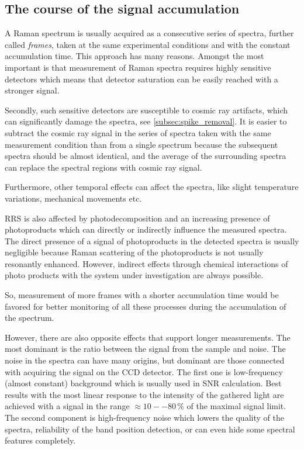\subsection{The course of the signal accumulation}

A Raman spectrum is usually acquired as a consecutive series of spectra,
further called \emph{frames}, taken at the same experimental conditions and
with the constant accumulation time.
This approach has many reasons.
Amongst the most important is that measurement of Raman spectra requires highly
sensitive detectors which means that detector saturation can be easily reached
with a stronger signal.

Secondly, such sensitive detectors are susceptible to cosmic ray artifacts,
which can significantly damage the spectra, see
\cref{subsec:spike_removal}.
It is easier to subtract the cosmic ray signal in the series of spectra taken
with the same measurement condition than from a single spectrum because the
subsequent spectra should be almost identical, and the average of the
surrounding spectra can replace the spectral regions with cosmic ray signal.

Furthermore, other temporal effects can affect the spectra, like slight
temperature variations, mechanical movements etc.

RRS is also affected by photodecomposition and an increasing presence of
photoproducts which can directly or indirectly influence the measured spectra.
The direct presence of a signal of photoproducts in the detected spectra is
usually negligible because Raman scattering of the photoproducts is not usually
resonantly enhanced.
However, indirect effects through chemical interactions of photo products with
the system under investigation are always possible.

So, measurement of more frames with a shorter accumulation time would be
favored for better monitoring of all these processes during the accumulation of
the spectrum.

However, there are also opposite effects that support longer measurements.
The most dominant is the ratio between the signal from the sample and noise.
The noise in the spectra can have many origins, but dominant are those
connected with acquiring the signal on the CCD detector.
The first one is low-frequency (almost constant) background which is usually
used in SNR calculation.
Best results with the most linear response to the intensity of the gathered
light are achieved with a signal in the range $\approx 10 -- 80\,\%$ of the
maximal signal limit.
The second component is high-frequency noise which lowers the quality of the
spectra, reliability of the band position detection, or can even hide some
spectral features completely.

